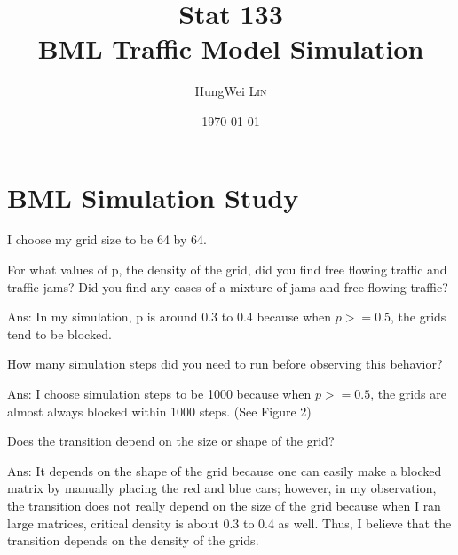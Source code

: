 \documentclass{article}
\title{Stat 133\\ BML Traffic Model Simulation} %
\author{HungWei \textsc{Lin}} %
\date{\today} %
\begin{document}
\maketitle %




\section{BML Simulation Study}

I choose my grid size to be 64 by 64.

\begin{enumerate}
\begin{item}
For what values of p, the density of the grid, did you find free flowing traffic and traffic jams? Did you find any cases of a mixture of jams and free flowing traffic?

Ans: In my simulation, p is around 0.3 to 0.4 because when $p>=0.5$, the grids tend to be blocked.
\end{item}

\begin{item}
How many simulation steps did you need to run before observing this behavior?

Ans: I choose simulation steps to be 1000 because when $p>=0.5$, the grids are almost always blocked within 1000 steps. (See Figure 2)

\end{item}
\begin{item}
Does the transition depend on the size or shape of the grid?

Ans: It depends on the shape of the grid because one can easily make a blocked matrix by manually placing the red and blue cars; however, in my observation, the transition does not really depend on the size of the grid because when I ran large matrices, critical density is about 0.3 to 0.4 as well. Thus, I believe that the transition depends on the density of the grids.
\end{item}
\end{enumerate}
\end{document}
